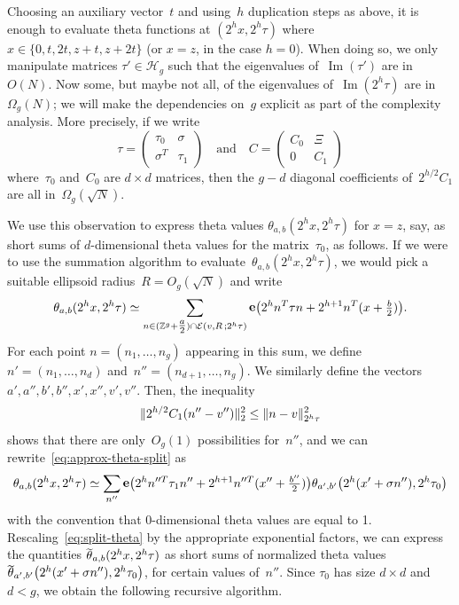 \documentclass[12pt,oneside]{amsart}
\numberwithin{equation}{section}
\theoremstyle{definition}
\newcommand{\Z}{\mathbb{Z}}
\newcommand{\Half}{\mathcal{H}}
\newcommand{\eld}[3]{\ensuremath{\mathcal{E}(#1, #2\,; #3)}}
\DeclareMathOperator{\im}{Im}
\DeclareMathOperator{\thetatilde}{\rlap{\raisebox{-0.1ex}{$\widetilde{\phantom{\,t}}$}}\theta}
\DeclareMathOperator{\e}{\mathbf{e}}
\DeclarePairedDelimiter{\paren}{(}{)}
\DeclarePairedDelimiter{\norm}{\|}{\|}
\begin{document}
Choosing an auxiliary vector~$t$ and using~$h$ duplication steps as above, it
is enough to evaluate theta functions at $(2^{h}x, 2^{h}\tau)$
where~$x\in \{0,t,2t,z+t,z+2t\}$ (or $x=z$, in the case $h=0$). When doing so,
we only manipulate matrices $\tau'\in \Half_g$ such that the eigenvalues
of~$\im(\tau')$ are in~$O(N)$. Now some, but maybe not all, of the eigenvalues
of~$\im(2^{h}\tau)$ are in~$\Omega_g(N)$; we will make the dependencies on~$g$
explicit as part of the complexity analysis. More precisely, if we write
\begin{equation}
  \label{eq:split-matrix}
  \tau = \begin{pmatrix} \tau_0 & \sigma \\ \sigma^T & \tau_1 \end{pmatrix}
  \quad \text{and}\quad
  C =
  \begin{pmatrix}
    C_0 & \Xi \\ 0 & C_1
  \end{pmatrix}
\end{equation}
where~$\tau_0$ and~$C_0$ are $d\times d$ matrices, then the $g-d$ diagonal
coefficients of~$2^{h/2}C_1$ are all in~$\Omega_g(\sqrt{N})$.

We use this observation to express theta values
$\theta_{a,b}(2^{h}x,2^{h}\tau)$ for $x=z$, say, as short sums of
$d$-dimensional theta values for the matrix~$\tau_0$, as follows. If we were to
use the summation algorithm to evaluate~$\theta_{a,b}(2^{h}x, 2^{h}\tau)$, we
would pick a suitable ellipsoid radius~$R = O_g(\sqrt{N})$ and write
\begin{equation}
  \label{eq:approx-theta-split}
  \theta_{a,b}(2^{h}x, 2^{h}\tau) \simeq \sum_{n\in \paren[\normalsize]{\Z^g + \tfrac a 2} \cap \eld{v}{R}{2^h\tau}}
  \e \paren[\big]{2^h n^T \tau n + 2^{h+1} n^T (x + \tfrac b2)}.
\end{equation}
For each point $n = (n_1,\ldots,n_g)$ appearing in this sum, we define
$n' = (n_1,\ldots,n_d)$ and~$n'' = (n_{d+1},\ldots, n_g)$. We similarly define
the vectors $a',a'',b',b'',x',x'',v',v''$. Then, the inequality
\begin{equation}
  \label{eq:split-norm-ineq}
  \norm{2^{h/2}C_1(n'' - v'')}_2^2 \leq \norm{n - v}_{2^h\tau}^2
\end{equation}
shows that there are only~$O_g(1)$ possibilities for~$n''$, and we can
rewrite~\eqref{eq:approx-theta-split} as
\begin{equation}
  \label{eq:split-theta}
  \theta_{a,b}(2^hx, 2^h\tau) \simeq \sum_{n''}
  \e\paren[\big]{2^h n''^T \tau_1 n'' + 2^{h+1} n''^T(x'' + \tfrac{b''}{2})}
  \theta_{a',b'} \paren[\big]{2^h(x' + \sigma n''), 2^h \tau_0}
\end{equation}
with the convention that $0$-dimensional theta values are equal to 1.
Rescaling~\eqref{eq:split-theta} by the appropriate exponential factors, we can
express the quantities $\thetatilde_{a,b}(2^hx, 2^h\tau)$ as short sums of
normalized theta values
$\thetatilde_{a',b'}\paren[\big]{2^h(x' + \sigma n''), 2^h\tau_0}$, for certain
values of~$n''$. Since $\tau_0$ has size $d\times d$ and $d<g$, we obtain the
following recursive algorithm.
\end{document}
